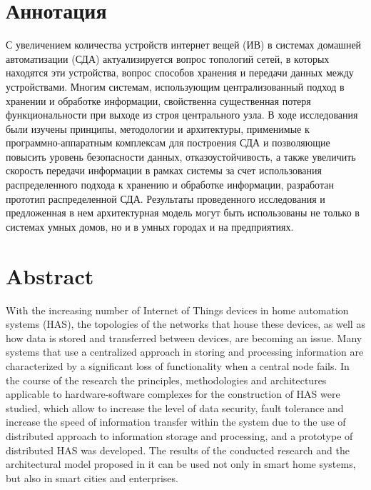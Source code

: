 \documentclass[14pt, a4paper]{extreport}
\begin{document}

%



\section*{Аннотация}

С увеличением количества устройств интернет вещей (ИВ) в системах домашней автоматизации (СДА) актуализируется вопрос топологий сетей, в которых находятся эти устройства, вопрос 
способов хранения и передачи данных между устройствами. Многим системам, использующим централизованный подход в хранении и обработке информации, свойственна существенная потеря
функциональности при выходе из строя центрального узла. В ходе исследования были изучены принципы, методологии и архитектуры, применимые к программно-аппаратным комплексам для
построения СДА и позволяющие повысить уровень безопасности данных, отказоустойчивость, а также увеличить скорость передачи информации в рамках системы за счет использования
распределенного подхода к хранению и обработке информации, разработан прототип распределенной СДА. Результаты проведенного исследования и предложенная в нем архитектурная модель
могут быть использованы не только в системах умных домов, но и в умных городах и на предприятиях.

\section*{Abstract}

With the increasing number of Internet of Things devices in home automation systems (HAS), the topologies of the networks that house these devices, as well as how data is stored
and transferred between devices, are becoming an issue. Many systems that use a centralized approach in storing and processing information are characterized by a significant loss of
functionality when a central node fails. In the course of the research the principles, methodologies and architectures applicable to hardware-software complexes for the construction
of HAS were studied, which allow to increase the level of data security, fault tolerance and increase the speed of information transfer within the system due to the use of distributed
approach to information storage and processing, and a prototype of distributed HAS was developed. The results of the conducted research and the architectural model proposed in it can
be used not only in smart home systems, but also in smart cities and enterprises.
\end{document}
